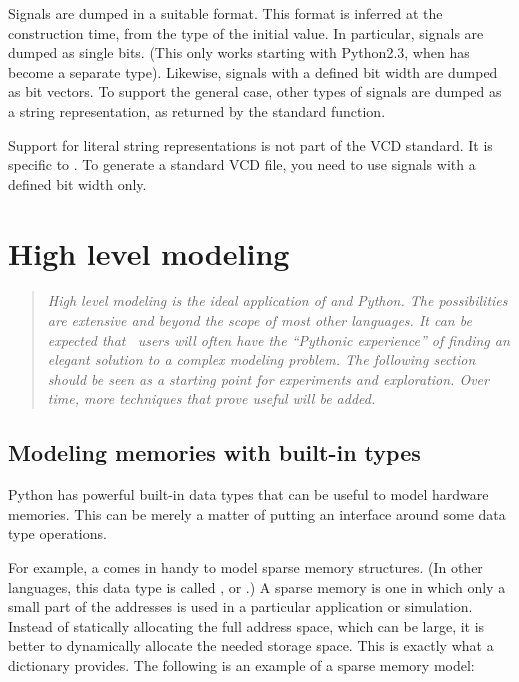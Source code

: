 Signals are dumped in a suitable format. This format is inferred at
the  construction time, from the type of the initial
value. In particular,  signals are dumped as single
bits. (This only works starting with Python2.3, when  has
become a separate type).  Likewise,  signals with a
defined bit width are dumped as bit vectors. To support the general
case, other types of signals are dumped as a string representation, as
returned by the standard  function.

\begin{notice}[warning]
Support for literal string representations is not part of the VCD
standard. It is specific to . To generate a
standard VCD file, you need to use signals with a defined bit width
only.
\end{notice}


\section{High level modeling \label{model-hl}}

\begin{quote}
\em 
High level modeling is the ideal application of \myhdl{} and Python.
The possibilities are extensive and beyond the scope of most other
languages. It can be expected that \myhdl\ users will often have the
``Pythonic experience'' of finding an elegant solution to a complex
modeling problem.  The following section should be seen as a starting
point for experiments and exploration. Over time, more techniques that
prove useful will be added.
\end{quote}

\subsection{Modeling memories with built-in types \label{model-mem}}

Python has powerful built-in data types that can be useful to model
hardware memories. This can be merely a matter of putting an interface
around some data type operations.

For example, a  comes in handy to model sparse memory
structures. (In other languages, this data type is called 
, or .) A sparse memory is one in
which only a small part of the addresses is used in a particular
application or simulation. Instead of statically allocating the full
address space, which can be large, it is better to dynamically
allocate the needed storage space. This is exactly what a dictionary
provides. The following is an example of a sparse memory model:

